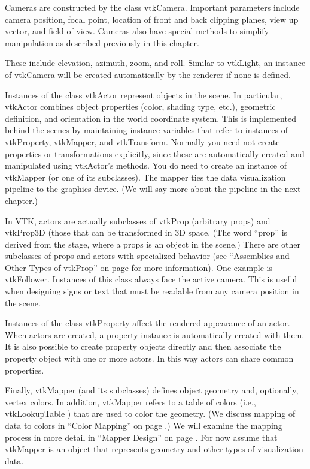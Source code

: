 Cameras are constructed by the class vtkCamera. Important parameters include camera position, focal point, location of front and back clipping planes, view up vector, and field of view. Cameras also have special methods to simplify manipulation as described previously in this chapter.

These include elevation, azimuth, zoom, and roll. Similar to vtkLight, an instance of vtkCamera will be created automatically by the renderer if none is defined.

Instances of the class vtkActor represent objects in the scene. In particular, vtkActor combines object properties (color, shading type, etc.), geometric definition, and orientation in the world coordinate system. This is implemented behind the scenes by maintaining instance variables that refer to instances of vtkProperty, vtkMapper, and vtkTransform. Normally you need not create properties or transformations explicitly, since these are automatically created and manipulated using vtkActor's methods. You do need to create an instance of vtkMapper (or one of its subclasses). The mapper ties the data visualization pipeline to the graphics device. (We will say more about the pipeline in the next chapter.)

 In VTK, actors are actually subclasses of vtkProp (arbitrary props) and vtkProp3D (those that can be transformed in 3D space. (The word ``prop'' is derived from the stage, where a props is an object in the scene.) There are other subclasses of props and actors with specialized behavior (see ``Assemblies and Other Types of vtkProp'' on page \pageref{subsubsec:assemblies_vtkprop} for more information). One example is vtkFollower. Instances of this class always face the active camera. This is useful when designing signs or text that must be readable from any camera position in the scene.

Instances of the class vtkProperty affect the rendered appearance of an actor. When actors are created, a property instance is automatically created with them. It is also possible to create property objects directly and then associate the property object with one or more actors. In this way actors can share common properties.

Finally, vtkMapper (and its subclasses) defines object geometry and, optionally, vertex colors. In addition, vtkMapper refers to a table of colors (i.e., vtkLookupTable ) that are used to color the geometry. (We discuss mapping of data to colors in ``Color Mapping'' on page \pageref{subsec:color_mapping}.) We will examine the mapping process in more detail in ``Mapper Design'' on page \pageref{subsubsec:mapper_design}. For now assume that vtkMapper is an object that represents geometry and other types of visualization data.

